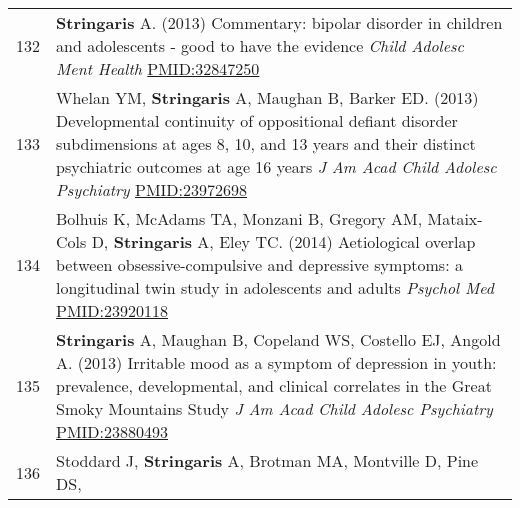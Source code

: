 \documentclass[
]{article}
\begin{document}
\begin{longtable}[]{@{}ll@{}}
\begin{minipage}[t]{0.01\columnwidth}\raggedright
132\strut
\end{minipage} & \begin{minipage}[t]{0.94\columnwidth}\raggedright
\textbf{Stringaris} A. (2013) Commentary: bipolar disorder in children
and adolescents - good to have the evidence \emph{Child Adolesc Ment
Health} \url{PMID:32847250}\strut
\end{minipage}\tabularnewline
\begin{minipage}[t]{0.01\columnwidth}\raggedright
133\strut
\end{minipage} & \begin{minipage}[t]{0.94\columnwidth}\raggedright
Whelan YM, \textbf{Stringaris} A, Maughan B, Barker ED. (2013)
Developmental continuity of oppositional defiant disorder subdimensions
at ages 8, 10, and 13 years and their distinct psychiatric outcomes at
age 16 years \emph{J Am Acad Child Adolesc Psychiatry}
\url{PMID:23972698}\strut
\end{minipage}\tabularnewline
\begin{minipage}[t]{0.01\columnwidth}\raggedright
134\strut
\end{minipage} & \begin{minipage}[t]{0.94\columnwidth}\raggedright
Bolhuis K, McAdams TA, Monzani B, Gregory AM, Mataix-Cols D,
\textbf{Stringaris} A, Eley TC. (2014) Aetiological overlap between
obsessive-compulsive and depressive symptoms: a longitudinal twin study
in adolescents and adults \emph{Psychol Med} \url{PMID:23920118}\strut
\end{minipage}\tabularnewline
\begin{minipage}[t]{0.01\columnwidth}\raggedright
135\strut
\end{minipage} & \begin{minipage}[t]{0.94\columnwidth}\raggedright
\textbf{Stringaris} A, Maughan B, Copeland WS, Costello EJ, Angold A.
(2013) Irritable mood as a symptom of depression in youth: prevalence,
developmental, and clinical correlates in the Great Smoky Mountains
Study \emph{J Am Acad Child Adolesc Psychiatry}
\url{PMID:23880493}\strut
\end{minipage}\tabularnewline
\begin{minipage}[t]{0.01\columnwidth}\raggedright
136\strut
\end{minipage} & \begin{minipage}[t]{0.94\columnwidth}\raggedright
Stoddard J, \textbf{Stringaris} A, Brotman MA, Montville D, Pine DS,

\end{minipage}
\end{longtable}
\end{document}
